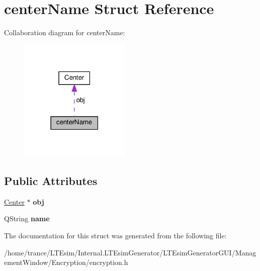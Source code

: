 \hypertarget{structcenter_name}{}\section{center\+Name Struct Reference}
\label{structcenter_name}


Collaboration diagram for center\+Name\+:
\nopagebreak
\begin{figure}[H]
\begin{center}
\leavevmode
\includegraphics[width=150pt]{structcenter_name__coll__graph}
\end{center}
\end{figure}
\subsection*{Public Attributes}
\begin{DoxyCompactItemize}
\item 
\hyperlink{class_center}{Center} $\ast$ {\bfseries obj}\hypertarget{structcenter_name_a8224393b959591c56b9d46b29ad43098}{}\label{structcenter_name_a8224393b959591c56b9d46b29ad43098}

\item 
Q\+String {\bfseries name}\hypertarget{structcenter_name_aba5ff6b06f58f2b0fce0ee81bf0cb624}{}\label{structcenter_name_aba5ff6b06f58f2b0fce0ee81bf0cb624}

\end{DoxyCompactItemize}


The documentation for this struct was generated from the following file\+:\begin{DoxyCompactItemize}
\item 
/home/trance/\+L\+T\+Esim/\+Internal.\+L\+T\+Esim\+Generator/\+L\+T\+Esim\+Generator\+G\+U\+I/\+Management\+Window/\+Encryption/encryption.\+h\end{DoxyCompactItemize}
